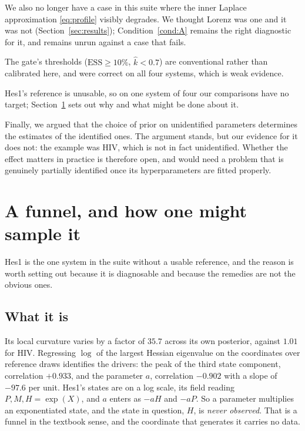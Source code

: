 \documentclass[11pt]{article}
\newcommand{\khat}{\widehat{k}}
\theoremstyle{plain}
\theoremstyle{definition}
\theoremstyle{remark}
\begin{document}
We also no longer have a case in this suite where the inner Laplace approximation
\eqref{eq:profile} visibly degrades. We thought Lorenz was one and it was not
(Section~\ref{sec:results}); Condition~\ref{cond:A} remains the right diagnostic for it, and
remains unrun against a case that fails.

The gate's thresholds ($\mathrm{ESS} \ge 10\%$, $\khat < 0.7$) are conventional rather than
calibrated here, and were correct on all four systems, which is weak evidence.

Hes1's reference is unusable, so on one system of four our comparisons have no target;
Section~\ref{sec:funnel} sets out why and what might be done about it.

Finally, we argued that the choice of prior on unidentified parameters determines the estimates of
the identified ones. The argument stands, but our evidence for it does not: the example was HIV,
which is not in fact unidentified. Whether the effect matters in practice is therefore open, and
would need a problem that is genuinely partially identified once its hyperparameters are fitted
properly.

\section{A funnel, and how one might sample it}
\label{sec:funnel}

Hes1 is the one system in the suite without a usable reference, and the reason is worth setting out
because it is diagnosable and because the remedies are not the obvious ones.

\subsection{What it is}

Its local curvature varies by a factor of $35.7$ across its own posterior, against $1.01$ for HIV.
Regressing $\log$ of the largest Hessian eigenvalue on the coordinates over reference draws
identifies the drivers: the peak of the third state component, correlation $+0.933$, and the
parameter $a$, correlation $-0.902$ with a slope of $-97.6$ per unit. Hes1's states are on a log
scale, its field reading $P, M, H = \exp(X)$, and $a$ enters as $-aH$ and $-aP$. So a parameter
multiplies an exponentiated state, and the state in question, $H$, is \emph{never observed}. That
is a funnel in the textbook sense, and the coordinate that generates it carries no data.
\end{document}

